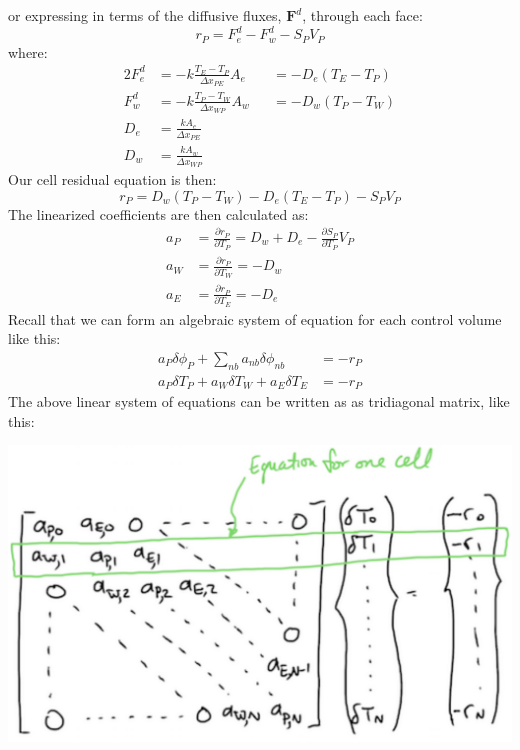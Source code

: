 \documentclass[11pt]{article}
\begin{document}
or expressing in terms of the diffusive fluxes, \(\textbf{F}^d\), through each face:
\begin{equation}
r_P = F_{e}^d - F_{w}^d - S_PV_P
\end{equation}
where:\\
\begin{alignat}{2}
F_{e}^d &= - k\frac{T_E-T_P}{\Delta x_{PE}}A_e &&= -D_e(T_E- T_P)\\
F_{w}^d &= - k\frac{T_P-T_W}{\Delta x_{WP}}A_w &&= -D_w(T_P- T_W)\\
D_e &= \frac{kA_e}{\Delta x_{PE}}\\
D_w &= \frac{kA_w}{\Delta x_{WP}}
\end{alignat}
Our cell residual equation is then:
\begin{equation}
r_P = D_w (T_P-T_W)-D_e(T_E-T_P)-S_PV_P
\end{equation}
The linearized coefficients are then calculated as:
\begin{align}
a_P &= \frac{\partial r_P}{\partial T_P} = D_w + D_e - \frac{\partial S_P}{\partial T_P}V_P\\
a_W &= \frac{\partial r_P}{\partial T_W} = -D_w\\
a_E &= \frac{\partial r_P}{\partial T_E} = -D_e
\end{align}
Recall that we can form an algebraic system of equation for each control volume like this:
\begin{align}
a_P\delta \phi_P + \sum_{nb} a_{nb}\delta \phi_{nb} &= -r_P\\
a_P\delta T_P + a_W\delta T_W + a_E \delta T_E &= -r_P 
\end{align}
The above linear system of equations can be written as as tridiagonal matrix, like this:
\begin{center}
\includegraphics[scale=0.2]{../pic/heat1D_tridiagonal.png}
\end{center}
\end{document}
